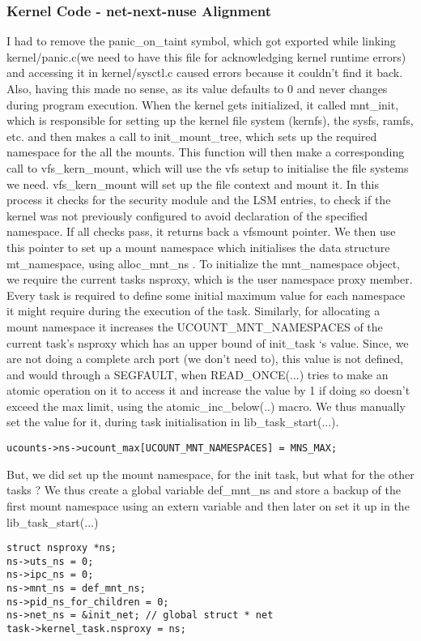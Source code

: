 \documentclass{sig-alternate}
\begin{document}
\subsubsection{Kernel Code - net-next-nuse Alignment}
I had to remove the panic\_on\_taint symbol, which got exported while linking kernel/panic.c(we need to have this file for acknowledging kernel
runtime errors) and accessing it in kernel/sysctl.c caused errors because it couldn’t find it back. Also, having this made no sense, as its value
defaults to 0 and never changes during program execution. When the kernel gets initialized, it called mnt\_init, which is responsible for setting
up the kernel file system (kernfs), the sysfs, ramfs, etc. and then makes a call to init\_mount\_tree, which sets up the required namespace for the
all the mounts. This function will then make a corresponding call to vfs\_kern\_mount, which will use the vfs setup to initialise the file systems
we need. vfs\_kern\_mount will set up the file context and mount it. In this process it checks for the security module and the LSM entries, to check
if the kernel was not previously configured to avoid declaration of the specified namespace. If all checks pass, it returns back a vfsmount
pointer. We then use this pointer to set up a mount namespace which initialises the data structure mt\_namespace, using alloc\_mnt\_ns . To
initialize the mnt\_namespace object, we require the current tasks nsproxy, which is the user namespace proxy member. Every task is required to
define some initial maximum value for each namespace it might require during the execution of the task. Similarly, for allocating a mount
namespace it increases the UCOUNT\_MNT\_NAMESPACES of the current task’s nsproxy which has an upper bound of init\_task ‘s value. Since, we are not
doing a complete arch port (we don’t need to), this value is not defined, and would through a SEGFAULT, when READ\_ONCE(...) tries to make an
atomic operation on it to access it and increase the value by 1 if doing so doesn’t exceed the max limit, using the atomic\_inc\_below(..)  macro.
We thus manually set the value for it, during task initialisation in lib\_task\_start(...).

\begin{lstlisting}[style=CStyle]
ucounts->ns->ucount_max[UCOUNT_MNT_NAMESPACES] = MNS_MAX;
\end{lstlisting}

But, we did set up the mount namespace, for the init task, but what for the other tasks ? We thus create a global variable def\_mnt\_ns and
store a backup of the first mount namespace using an extern variable and then later on set it up in the lib\_task\_start(...)
\begin{lstlisting}[style=CStyle]
struct nsproxy *ns;
ns->uts_ns = 0;
ns->ipc_ns = 0;
ns->mnt_ns = def_mnt_ns;
ns->pid_ns_for_children = 0;
ns->net_ns = &init_net; // global struct * net   
task->kernel_task.nsproxy = ns;
\end{lstlisting}
\end{document}
